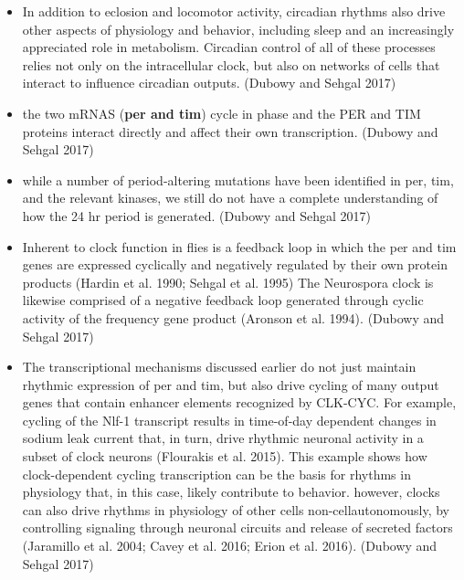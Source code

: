 \documentclass[11pt]{article}
\begin{document}
\begin{itemize}
    \item In addition to eclosion and locomotor activity, circadian rhythms also drive other aspects
    of physiology and behavior, including sleep and an increasingly appreciated role in metabolism.
    Circadian control of all of these processes relies not only on the intracellular clock, but also
    on networks of cells that interact to influence circadian outputs.
    \cite{dubowyCircadianRhythmsSleep2017} (Dubowy and Sehgal 2017)

    \item the two mRNAS (\textbf{per and tim}) cycle in phase and the PER and TIM proteins interact
    directly and affect their own transcription.
    \cite{dubowyCircadianRhythmsSleep2017} (Dubowy and Sehgal 2017)

    \item while a number of period-altering mutations have been identified in per, tim, and the relevant
    kinases, we still do not have a complete understanding of how the 24 hr period is generated.
    \cite{dubowyCircadianRhythmsSleep2017} (Dubowy and Sehgal 2017)

    \item Inherent to clock function in flies is a feedback loop in which the per and tim genes are
    expressed cyclically and negatively regulated by their own protein products (Hardin et al. 1990;
    Sehgal et al. 1995) The Neurospora clock is likewise comprised of a negative feedback loop
    generated through cyclic activity of the frequency gene product (Aronson et al. 1994).
    \cite{dubowyCircadianRhythmsSleep2017} (Dubowy and Sehgal 2017)

    \item The transcriptional mechanisms discussed earlier do not just maintain rhythmic expression of
    per and tim, but also drive cycling of many output genes that contain enhancer elements recognized
    by CLK-CYC. For example, cycling of the Nlf-1 transcript results in time-of-day dependent
    changes in sodium leak current that, in turn, drive rhythmic neuronal activity in a subset
    of clock neurons (Flourakis et al. 2015).
    This example shows how clock-dependent cycling transcription can be the basis for rhythms in
    physiology that, in this case, likely contribute to behavior.
    however, clocks can also drive rhythms in physiology of other cells non-cellautonomously, by
    controlling signaling through neuronal circuits and release of secreted factors
    (Jaramillo et al. 2004; Cavey et al. 2016; Erion et al. 2016).
    \cite{dubowyCircadianRhythmsSleep2017} (Dubowy and Sehgal 2017)


\end{itemize}
\end{document}

